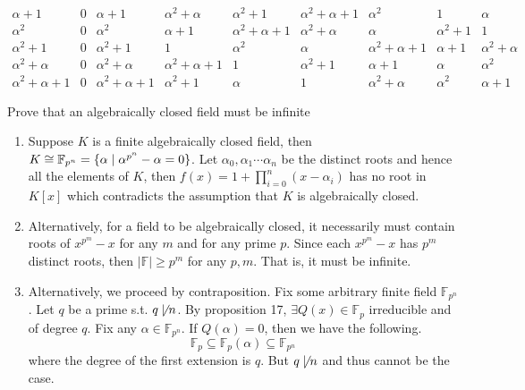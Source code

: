\begin{solution}
$$\begin{array}{c|cccccccc}
    \alpha + 1 & 0 & \alpha + 1 & \alpha^2 + \alpha & \alpha^2 + 1 & \alpha^2 + \alpha + 1 & \alpha^2 & 1 & \alpha \\
    \alpha^2 & 0 & \alpha^2 & \alpha + 1 & \alpha^2 + \alpha + 1 & \alpha^2 + \alpha & \alpha & \alpha^2 + 1 & 1 \\
    \alpha^2 + 1 & 0 & \alpha^2 + 1 & 1 & \alpha^2 & \alpha & \alpha^2 + \alpha + 1 & \alpha + 1 & \alpha^2 + \alpha \\ 
    \alpha^2 + \alpha & 0 & \alpha^2 + \alpha & \alpha^2 + \alpha + 1 & 1 & \alpha^2 + 1 & \alpha + 1 & \alpha & \alpha^2 \\ 
    \alpha^2 + \alpha + 1 & 0 & \alpha^2 + \alpha + 1 & \alpha^2 + 1 & \alpha & 1 & \alpha^2 + \alpha & \alpha^2 & \alpha + 1
    \end{array}
    $$
\end{solution}

\begin{exercise}
    Prove that an algebraically closed field must be infinite
\end{exercise}
\begin{solution}
   \begin{enumerate}[(Method 1)]
       \item Suppose $K$ is a finite algebraically closed field, then $K \cong \mathbb{F}_{p^n} = \{\alpha \mid \alpha^{p^n} - \alpha = 0\}$. Let $\alpha_0, \alpha_1 \cdots \alpha_n$ be the distinct roots and hence all the elements of $K$, then $f(x) = 1 + \prod_{i = 0}^n(x - \alpha_i)$ has no root in $K[x]$ which contradicts the assumption that $K$ is algebraically closed. %

       \item Alternatively, for a field to be algebraically closed, it necessarily must contain roots of $x^{p^{m}}-x$ for any $m$ and for any prime $p$. Since each $x^{p^{m}}-x$ has $p^{m}$ distinct roots, then $|\mathbb{F}|\geq p^{m}$ for any $p,m$. That is, it must be infinite.

       \item  Alternatively, we proceed by contraposition. Fix some arbitrary finite field $\mathbb{F}_{p^{n}}$. Let $q$ be a prime s.t. $q\not\mid n$. By proposition 17, $\exists Q(x)\in\mathbb{F}_{p}$ irreducible and of degree $q$. Fix any $\alpha\in\mathbb{F}_{p^{n}}$. If $Q(\alpha)=0$, then we have the following.
   $$
   \mathbb{F}_{p}\subseteq\mathbb{F}_{p}(\alpha)\subseteq\mathbb{F}_{p^{n}}
   $$
   where the degree of the first extension is $q$. But $q\not\mid n$ and thus cannot be the case.
   \end{enumerate}
\end{solution}

